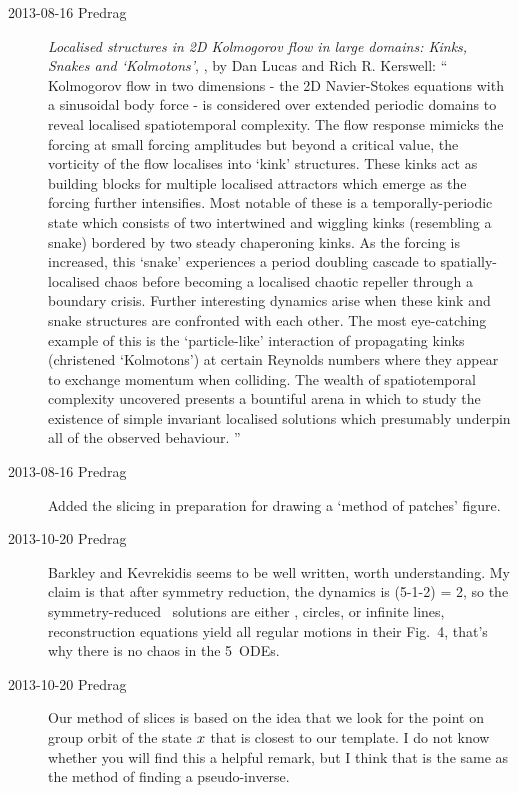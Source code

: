 \begin{description}
\item[2013-08-16 Predrag]
{\em Localised structures in 2D Kolmogorov flow in large domains:
Kinks, Snakes and `Kolmotons'}, , by
Dan Lucas and Rich R. Kerswell:
``
Kolmogorov flow in two dimensions - the 2D Navier-Stokes equations with a
sinusoidal body force - is considered over extended periodic domains to
reveal localised spatiotemporal complexity. The flow response mimicks the
forcing at small forcing amplitudes but beyond a critical value, the
vorticity of the flow localises into `kink' structures. These kinks act
as building blocks for multiple localised attractors which emerge as the
forcing further intensifies. Most notable of these is a
temporally-periodic state which consists of two intertwined and wiggling
kinks (resembling a snake) bordered by two steady chaperoning kinks. As
the forcing is increased, this `snake' experiences a period doubling
cascade to spatially-localised chaos before becoming a localised chaotic
repeller through a boundary crisis. Further interesting dynamics arise
when these kink and snake structures are confronted with each other. The
most eye-catching example of this is the `particle-like' interaction of
propagating kinks (christened `Kolmotons') at certain Reynolds numbers
where they appear to exchange momentum when colliding. The wealth of
spatiotemporal complexity uncovered presents a bountiful arena in which
to study the existence of simple invariant localised solutions which
presumably underpin all of the observed behaviour.
''

\item[2013-08-16 Predrag]
Added the slicing  in preparation for drawing a
`method of patches' figure.

\item[2013-10-20 Predrag]
Barkley and Kevrekidis seems to be well written, worth
understanding. My claim is that after symmetry reduction, the dynamics is
(5-1-2) = 2\dmn, so the symmetry-reduced \statesp\
solutions are either \eqva, circles, or infinite
lines, reconstruction equations yield all regular motions in
their Fig.~4, that's why there is no chaos in the 5\dmn\ ODEs.

\item[2013-10-20 Predrag] Our method of slices is based on the idea that
we look for the point on group orbit of the state $x$ that is closest
to our template. I do not know whether you will find this a helpful remark, but
I think that is the same as the method of finding a
{pseudo-inverse}.


\end{description}
